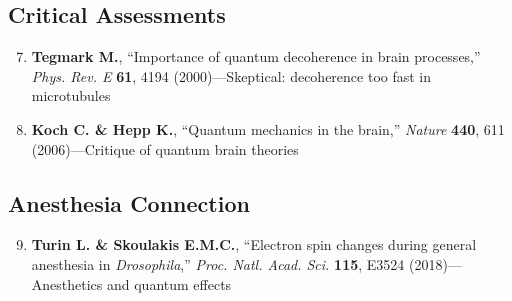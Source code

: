 \subsection*{Critical Assessments}

\begin{enumerate}
\setcounter{enumi}{6}
\item \textbf{Tegmark M.}, ``Importance of quantum decoherence in brain processes,'' \emph{Phys. Rev. E} \textbf{61}, 4194 (2000)---Skeptical: decoherence too fast in microtubules
\item \textbf{Koch C. \& Hepp K.}, ``Quantum mechanics in the brain,'' \emph{Nature} \textbf{440}, 611 (2006)---Critique of quantum brain theories
\end{enumerate}

\subsection*{Anesthesia Connection}

\begin{enumerate}
\setcounter{enumi}{8}
\item \textbf{Turin L. \& Skoulakis E.M.C.}, ``Electron spin changes during general anesthesia in \emph{Drosophila},'' \emph{Proc. Natl. Acad. Sci.} \textbf{115}, E3524 (2018)---Anesthetics and quantum effects
\end{enumerate}
